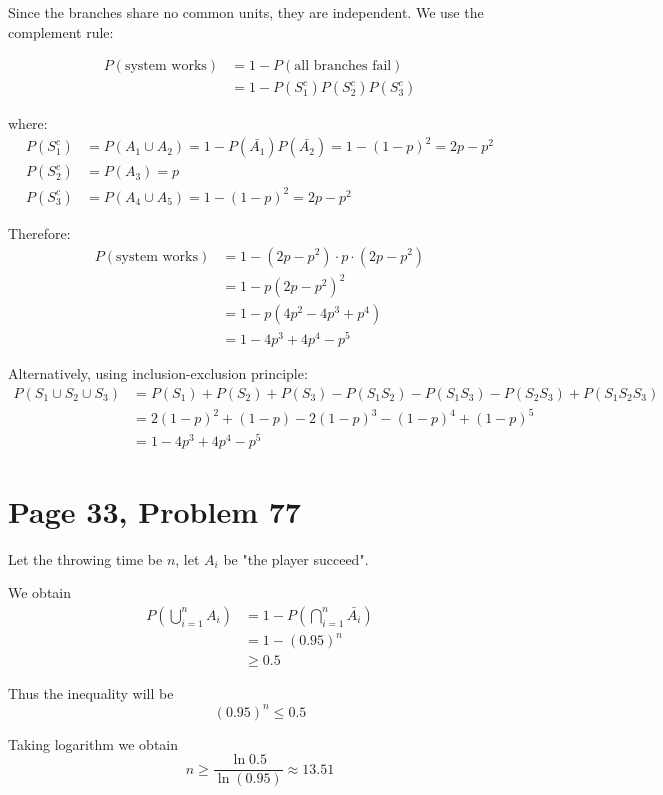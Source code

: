 \documentclass[a4paper, UTF-8]{article}
\theoremstyle{plain}
\begin{document}
Since the branches share no common units, they are independent. We use the complement rule:

\begin{align*}
P(\text{system works}) &= 1 - P(\text{all branches fail}) \\
&= 1 - P(S_1^c)P(S_2^c)P(S_3^c)
\end{align*}

where:
\begin{align*}
P(S_1^c) &= P(A_1 \cup A_2) = 1 - P(\bar{A_1})P(\bar{A_2}) = 1 - (1-p)^2 = 2p - p^2 \\
P(S_2^c) &= P(A_3) = p \\
P(S_3^c) &= P(A_4 \cup A_5) = 1 - (1-p)^2 = 2p - p^2
\end{align*}

Therefore:
\begin{align*}
P(\text{system works}) &= 1 - (2p-p^2) \cdot p \cdot (2p-p^2) \\
&= 1 - p(2p-p^2)^2 \\
&= 1 - p(4p^2 - 4p^3 + p^4) \\
&= 1 - 4p^3 + 4p^4 - p^5
\end{align*}

Alternatively, using inclusion-exclusion principle:
\begin{align*}
P(S_1 \cup S_2 \cup S_3) &= P(S_1) + P(S_2) + P(S_3) - P(S_1S_2) - P(S_1S_3) - P(S_2S_3) + P(S_1S_2S_3) \\
&= 2(1-p)^2 + (1-p) - 2(1-p)^3 - (1-p)^4 + (1-p)^5 \\
&= 1 - 4p^3 + 4p^4 - p^5
\end{align*}

\section{Page 33, Problem 77}

Let the throwing time be $n$, let $A_i$ be "the player succeed".

We obtain 
\begin{align*}
P(\bigcup_{i=1}^n A_i)  &= 1- P(\bigcap_{i=1}^n \bar{A_i}) \\
                        &= 1 - (0.95)^n \\ 
                        &\geq 0.5
\end{align*}

Thus the inequality will be 
$$
(0.95)^n \leq 0.5
$$

Taking logarithm we obtain 
$$
n \geq \frac{\ln 0.5}{\ln(0.95)} \approx 13.51
$$
\end{document}
